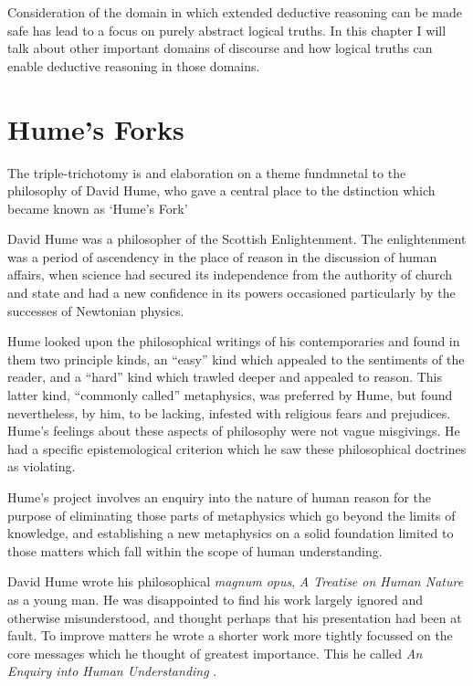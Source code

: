 Consideration of the domain in which extended deductive reasoning can be made safe has lead to a focus on purely abstract logical truths.
In this chapter I will talk about other important domains of discourse and how logical truths can enable deductive reasoning in those domains.

\section{Hume's Forks}\label{HF}

The triple-trichotomy is and elaboration on a theme fundmnetal to the philosophy of David Hume, who gave a central place to the dstinction which became known as `Hume's Fork' 


David Hume was a philosopher of the Scottish Enlightenment.
The enlightenment was a period of ascendency in the place of reason in
the discussion of human affairs, when science had secured its
independence from the authority of church and state and had a new
confidence in its powers occasioned particularly by the successes of
Newtonian physics.

Hume looked upon the philosophical writings of his contemporaries and
found in them two principle kinds, an ``easy'' kind which appealed to
the sentiments of the reader, and a ``hard'' kind which trawled deeper
and appealed to reason.
This latter kind, ``commonly called'' metaphysics, was preferred by
Hume, but found nevertheless, by him, to be lacking, infested with religious 
fears and prejudices.
Hume's feelings about these aspects of philosophy were not vague
misgivings.
He had a specific epistemological criterion which he saw these
philosophical doctrines as violating.

Hume's project involves an enquiry into the nature of human reason for
the purpose of eliminating those parts of metaphysics which go beyond
the limits of knowledge, and establishing a new metaphysics on a
solid foundation limited to those matters which fall within the scope
of human understanding.

David Hume wrote his philosophical {\it magnum opus}, {\it A Treatise on
  Human Nature} \cite{hume39} as a young man.
He was disappointed to find his work largely ignored and otherwise
misunderstood, and thought perhaps that his presentation had been at
fault.
To improve matters he wrote a shorter work more tightly focussed
on the core messages which he thought of greatest importance.
This he called {\it An Enquiry into Human Understanding}
\cite{hume48}.

